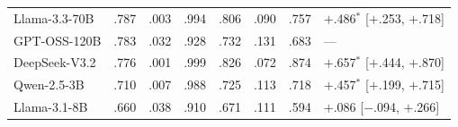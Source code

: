 \begin{table}[t]
\begin{tabular}{@{}lccccccl@{}}
Llama-3.3-70B & .787 & .003 & .994 & .806 & .090 & .757 & $+$.486$^{*}$ [$+$.253, $+$.718] \\
GPT-OSS-120B & .783 & .032 & .928 & .732 & .131 & .683 & --- \\
DeepSeek-V3.2 & .776 & .001 & .999 & .826 & .072 & .874 & $+$.657$^{*}$ [$+$.444, $+$.870] \\
Qwen-2.5-3B & .710 & .007 & .988 & .725 & .113 & .718 & $+$.457$^{*}$ [$+$.199, $+$.715] \\
Llama-3.1-8B & .660 & .038 & .910 & .671 & .111 & .594 & $+$.086 [$-$.094, $+$.266] \\
\bottomrule
\end{tabular}
\end{table}

